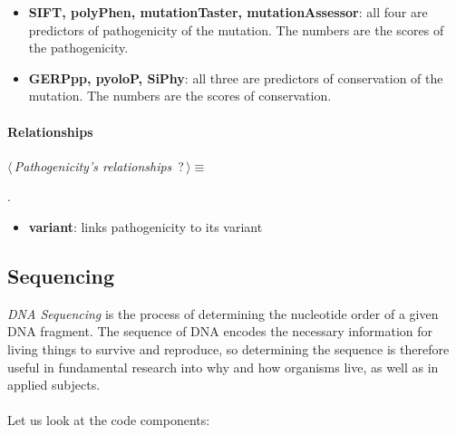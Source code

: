 \begin{itemize}
 	\item \textbf{SIFT, polyPhen, mutationTaster, mutationAssessor}: all four are predictors of pathogenicity of the mutation. The numbers are the scores of the pathogenicity.
 	\item \textbf{GERPpp, pyoloP, SiPhy}: all three are predictors of conservation of the mutation. The numbers are the scores of conservation.
\end{itemize}

\paragraph{Relationships} 

	\begin{flushleft} \small
\begin{minipage}{\linewidth}\label{scrap10}\raggedright\small
{} $\langle\,${\itshape {Pathogenicity's relationships}}\nobreak\ {\footnotesize {?}}$\,\rangle\equiv$
\vspace{-1ex}
\begin{list}{}{} \item

                
        {\NWsep}
\end{list}
\vspace{-1.5ex}
\footnotesize
\begin{list}{}{\setlength{\itemsep}{-\parsep}\setlength{\itemindent}{-\leftmargin}}
\item {\NWtxtMacroNoRef}.

\item{}
\end{list}
\end{minipage}\vspace{4ex}
\end{flushleft}
\begin{itemize}
 	\item \textbf{variant}: links pathogenicity to its variant
\end{itemize}


\subsection{Sequencing}
\emph{DNA Sequencing} is the process of determining the nucleotide order of a given DNA fragment. The sequence of DNA encodes the necessary information for living things to survive and reproduce, so determining the sequence is therefore useful in fundamental research into why and how organisms live, as well as in applied subjects.
\\
\\Let us look at the code components:

